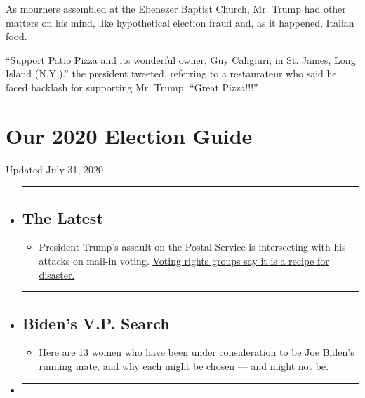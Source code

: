 As mourners assembled at the Ebenezer Baptist Church, Mr. Trump had
other matters on his mind, like hypothetical election fraud and, as it
happened, Italian food.

``Support Patio Pizza and its wonderful owner, Guy Caligiuri, in St.
James, Long Island (N.Y.).'' the president tweeted, referring to a
restaurateur who said he faced backlash for supporting Mr. Trump.
``Great Pizza!!!''

\hypertarget{our-2020-election-guide}{%
\section{Our 2020 Election Guide}\label{our-2020-election-guide}}

Updated July 31, 2020

\begin{itemize}
\item
  \begin{center}\rule{0.5\linewidth}{\linethickness}\end{center}

  \hypertarget{the-latest}{%
  \subsection{The Latest}\label{the-latest}}

  \begin{itemize}
  \tightlist
  \item
    President Trump's assault on the Postal Service is intersecting with
    his attacks on mail-in voting.
    \href{https://www.nytimes3xbfgragh.onion/2020/07/31/us/politics/trump-usps-mail-delays.html?action=click\&pgtype=Article\&state=default\&region=BELOW_MAIN_CONTENT\&context=storylines_guide}{Voting
    rights groups say it is a recipe for disaster.}
  \end{itemize}
\item
  \begin{center}\rule{0.5\linewidth}{\linethickness}\end{center}

  \hypertarget{bidens-vp-search}{%
  \subsection{Biden's V.P. Search}\label{bidens-vp-search}}

  \begin{itemize}
  \tightlist
  \item
    \href{https://www.nytimes3xbfgragh.onion/article/biden-vice-president-2020.html?action=click\&pgtype=Article\&state=default\&region=BELOW_MAIN_CONTENT\&context=storylines_guide}{Here
    are 13 women} who have been under consideration to be Joe Biden's
    running mate, and why each might be chosen --- and might not be.
  \end{itemize}
\item
  \begin{center}\rule{0.5\linewidth}{\linethickness}\end{center}


\end{itemize}
